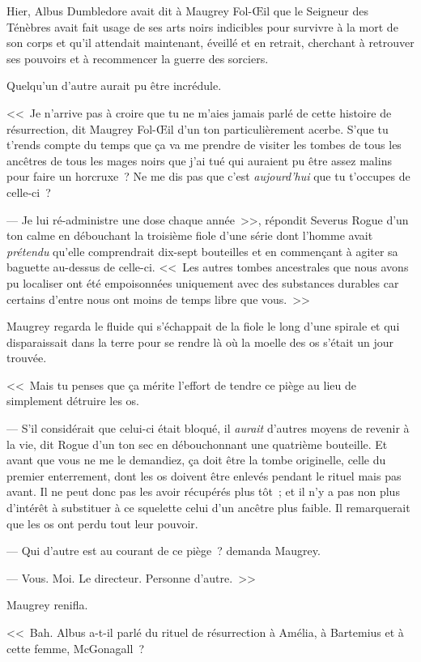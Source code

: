 Hier, Albus Dumbledore avait dit à Maugrey Fol-Œil que le Seigneur des Ténèbres avait fait usage de ses arts noirs indicibles pour survivre à la mort de son corps et qu'il attendait maintenant, éveillé et en retrait, cherchant à retrouver ses pouvoirs et à recommencer la guerre des sorciers.

Quelqu'un d'autre aurait pu être incrédule.

<<~Je n'arrive pas à croire que tu ne m'aies jamais parlé de cette histoire de résurrection, dit Maugrey Fol-Œil d'un ton particulièrement acerbe. S'que tu t'rends compte du temps que ça va me prendre de visiter les tombes de tous les ancêtres de tous les mages noirs que j'ai tué qui auraient pu être assez malins pour faire un horcruxe~? Ne me dis pas que c'est \emph{aujourd'hui} que tu t'occupes de celle-ci~?

--- Je lui ré-administre une dose chaque année~>>, répondit Severus Rogue d'un ton calme en débouchant la troisième fiole d'une série dont l'homme avait \emph{prétendu} qu'elle comprendrait dix-sept bouteilles et en commençant à agiter sa baguette au-dessus de celle-ci. <<~Les autres tombes ancestrales que nous avons pu localiser ont été empoisonnées uniquement avec des substances durables car certains d'entre nous ont moins de temps libre que vous.~>>

Maugrey regarda le fluide qui s'échappait de la fiole le long d'une spirale et qui disparaissait dans la terre pour se rendre là où la moelle des os s'était un jour trouvée.

<<~Mais tu penses que ça mérite l'effort de tendre ce piège au lieu de simplement détruire les os.

--- S'il considérait que celui-ci était bloqué, il \emph{aurait} d'autres moyens de revenir à la vie, dit Rogue d'un ton sec en débouchonnant une quatrième bouteille. Et avant que vous ne me le demandiez, ça doit être la tombe originelle, celle du premier enterrement, dont les os doivent être enlevés pendant le rituel mais pas avant. Il ne peut donc pas les avoir récupérés plus tôt~; et il n'y a pas non plus d'intérêt à substituer à ce squelette celui d'un ancêtre plus faible. Il remarquerait que les os ont perdu tout leur pouvoir.

--- Qui d'autre est au courant de ce piège~? demanda Maugrey.

--- Vous. Moi. Le directeur. Personne d'autre.~>>

Maugrey renifla.

<<~Bah. Albus a-t-il parlé du rituel de résurrection à Amélia, à Bartemius et à cette femme, McGonagall~?

